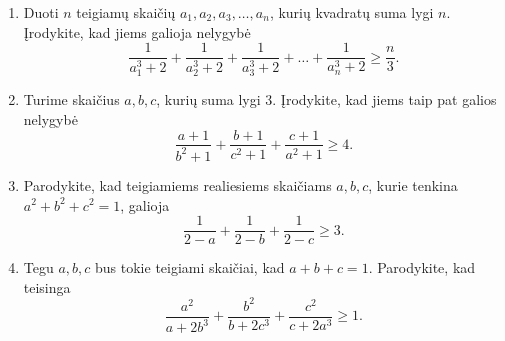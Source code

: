 \begin{enumerate}
  \item Duoti $n$ teigiamų skaičių $a_1,a_2,a_3,\ldots,a_n$, kurių kvadratų
    suma lygi $n$. Įrodykite, kad jiems galioja nelygybė
    $$\frac{1}{a_1^3+2}+\frac{1}{a_2^3+2}+\frac{1}{a_3^3+2}+\ldots+\frac{1}{a_n^3+2}\geq\frac{n}{3}.$$
  \item Turime skaičius $a,b,c$, kurių suma lygi 3. Įrodykite, kad jiems
    taip pat galios nelygybė
    $$\frac{a+1}{b^2+1}+\frac{b+1}{c^2+1}+\frac{c+1}{a^2+1}\geq 4.$$
  \item {} Parodykite, kad teigiamiems realiesiems
    skaičiams $a,b,c$, kurie tenkina $a^2+b^2+c^2=1$, galioja
    $$\frac{1}{2-a}+\frac{1}{2-b}+\frac{1}{2-c}\geq 3.$$
  \item Tegu $a,b,c$ bus tokie teigiami skaičiai, kad $a+b+c=1$.
    Parodykite, kad teisinga
    $$\frac{a^2}{a+2b^3}+\frac{b^2}{b+2c^3}+\frac{c^2}{c+2a^3}\geq1.$$
\end{enumerate}

